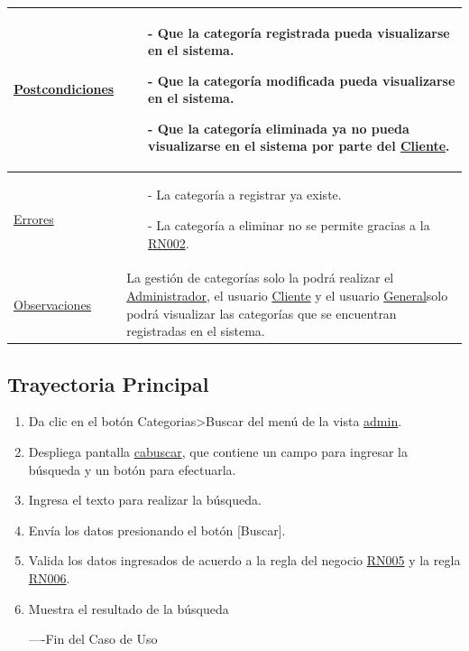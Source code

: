 \begin{longtable}{p{4cm}|p{11cm}}
				\hline
					{\hyperlink {Postcondiciones}{Postcondiciones}}&{
					\begin{itemize}
						\item[-] Que la categor\'ia registrada pueda visualizarse en el sistema.
						\item[-] Que la categor\'ia modificada pueda visualizarse en el sistema.
						\item[-] Que la categor\'ia eliminada ya no pueda visualizarse en el sistema por parte del \hyperlink{Cliente}{Cliente}.
						\end{itemize}
						}\\
				\hline
					{\hyperlink {Errores}{Errores}}&{
					\begin{itemize}
						\item[-] La categor\'ia a registrar ya existe.
						\item[-] La categor\'ia a eliminar no se permite gracias a la \hyperlink{RN002}{RN002}.
					\end{itemize}		
					}\\
				\hline
					{\hyperlink {Observaciones}{Observaciones}}&{La gesti\'on de categor\'ias solo la podr\'a realizar el \hyperlink{Administrador}{Administrador}, el usuario \hyperlink{Cliente}{Cliente} y el usuario \hyperlink{General}{General}solo podr\'a visualizar las categor\'ias que se encuentran registradas en el sistema.}
				\end{longtable}

\newpage
	\hypertarget{Ver categoria}{}
	\subsection {Trayectoria Principal}
		\begin{enumerate}
			\item \UCactor Da clic en el botón Categorias>Buscar del men\'u de la vista \hyperlink{admin}{admin}.
			
			\item \UCsist Despliega pantalla \hyperlink{cabuscar}{cabuscar}, que contiene un campo para ingresar la búsqueda y un botón para efectuarla.
			
			\item \UCactor Ingresa el texto para realizar la b\'usqueda.
			
			\item \UCactor Env\'ia los datos presionando el bot\'on [Buscar].
			
			\item \UCsist  Valida los datos ingresados de acuerdo a la regla del negocio \hyperlink {RN005}{RN005} y la regla \hyperlink {RN006}{RN006}.
			
			\item \UCsist Muestra el resultado de la b\'usqueda 
			
			----Fin del Caso de Uso
		\end{enumerate}

